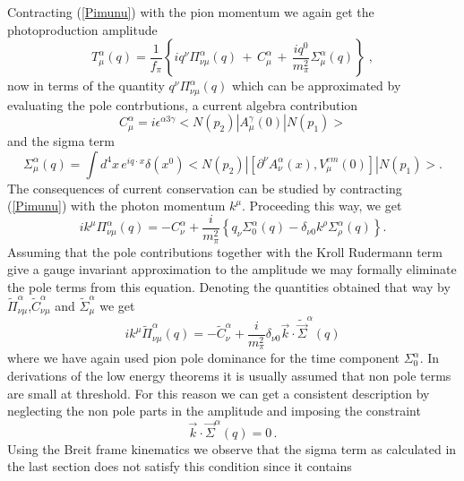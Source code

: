 Contracting (\ref{Pimunu}) with the pion momentum we again get 
the photoproduction amplitude
\begin{equation}
\label{LET2}
T_\mu^\alpha (q) = \frac{1}{f_\pi}\left\{
iq^\nu \Pi_{\nu\mu}^\alpha (q) \, + \, C_\mu^\alpha  \, + \,
\frac{i q^0}{m_\pi^2} \Sigma^\alpha_\mu (q) \right\} \; ,
\end{equation}
now in terms of the quantity $q^\nu \Pi_{\nu\mu}^\alpha (q)$ which 
can be approximated by evaluating the pole contrbutions, a current
algebra contribution
\begin{equation}
 C_\mu^\alpha  =i \epsilon^{\alpha 3 \gamma} <N(p_2)| A_\mu^\gamma (0)|N(p_1)>
\end{equation}
and the sigma term
\begin{equation}
 \Sigma_\mu^\alpha (q) = \int d^4 x\, e^{iq\cdot x} \delta (x^0)
 <N(p_2)| [\partial^\nu A_\nu^\alpha (x), V_\mu^{em} (0)] |N(p_1)>.
\end{equation}
The consequences of current conservation can be studied by contracting
(\ref{Pimunu}) with the photon momentum $k^\mu$. Proceeding this way, we get
\begin{equation}
\label{gi}
ik^\mu \Pi_{\nu\mu}^\alpha (q) = - C^\alpha_\nu + \frac{i}{m_\pi^2}
\left\{ q_\nu \Sigma_0^\alpha (q) - \delta_{\nu 0} k^\rho \Sigma_\rho^\alpha
 (q) \right\} .
\end{equation}
Assuming that the pole contributions together with the Kroll Rudermann
term  give a gauge invariant approximation to the amplitude we may formally
eliminate the pole terms from this equation. Denoting the quantities 
obtained that way by $\tilde{\Pi}^\alpha_{\nu\mu}$,$\tilde{C}^\alpha_{\nu\mu}$
and $\tilde{\Sigma}_\mu^\alpha$ we get
\begin{equation}
ik^\mu \tilde{\Pi}^\alpha_{\nu\mu}(q)=-\tilde{C}^\alpha_\nu +
\frac{i}{m_\pi^2} \delta_{\nu 0} \vec{k}\cdot\tilde{\vec{\Sigma}}^\alpha (q)
\end{equation}
where we have again used pion pole dominance for the time component
$\Sigma_0^\alpha$. In derivations of the low energy theorems it is
usually assumed that non pole terms are small at threshold. For this reason we
can get a consistent description by neglecting the non pole parts in the 
amplitude and imposing the constraint
\begin{equation}
\vec{k}\cdot\vec{\Sigma}^\alpha (q) =0 \, .
\end{equation}
Using the Breit frame kinematics we observe that the sigma term as calculated
in the last section does not satisfy this condition since it contains

